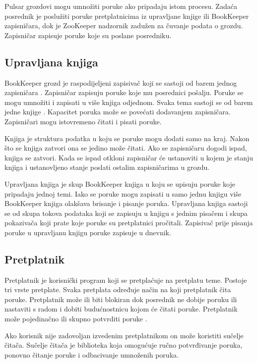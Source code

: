 \documentclass[utf8, diplomski, lmodern, numeric]{fer}
\begin{document}
Pulsar grozdovi mogu umnožiti poruke ako pripadaju istom procesu. Zadaća posrednik je poslužiti poruke pretplatnicima iz upravljane knjige ili BookKeeper zapisničara, dok je ZooKeeper nadzornik zadužen za čuvanje podata o grozdu. Zapisničar zapisuje poruke koje su poslane posredniku.

\subsection{Upravljana knjiga}

BookKeeper grozd je raspodijeljeni zapisivač koji se sastoji od barem jednog zapisničara . Zapisničar zapisuju poruke koje mu posrednici pošalju. Poruke se mogu umnožiti i zapisati u više knjiga odjednom. Svaka tema sastoji se od barem jedne knjige . Kapacitet poruka može se povećati dodavanjem zapisničara. Zapisničari mogu istovremeno čitati i pisati poruke.

Knjiga je struktura podatka u koju se poruke mogu dodati samo na kraj. Nakon što se knjiga zatvori ona se jedino može čitati. Ako se zapisničaru dogodi ispad, knjiga se zatvori. Kada se ispad otkloni zapisničar će ustanoviti u kojem je stanju knjiga i ustanovljeno stanje poslati ostalim zapisničarima u grozdu.

Upravljana knjiga  je skup BookKeeper knjiga u koju se upisuju poruke koje pripadaju jednoj temi. Iako se poruke mogu zapisati u samo jednu knjigu više BookKeeper knjiga olakšava brisanje i pisanje poruka. Upravljana knjiga sastoji se od skupa tokova podataka koji se zapisuju u knjigu s jednim pisačem i skupa pokazivača koji prate koje poruke su pretplatnici pročitali. Zapisivač prije pisanja poruke u upravljanu knjigu poruke zapisuje u dnevnik.

\subsection{Pretplatnik}

Pretplatnik je korisnički program koji se pretplaćuje na pretplatu teme. Postoje tri vrste pretplate. Svaka pretplata određuje način na koji pretplatnik čita poruke. Pretplatnik može ili biti blokiran dok posrednik ne dobije poruku ili nastaviti s radom i dobiti budućnostnicu  kojom će čitati poruke. Pretplatnik može pojedinačno ili skupno potvrditi poruke .

Ako korisnik nije zadovoljan izvedenim pretplatnikom on može koristiti sučelje čitača. Sučelje čitača je biblioteka koja omogućuje ručno potvrđivanje poruka, ponovno čitanje poruke i odbacivanje umnoženih poruka.
\end{document}
